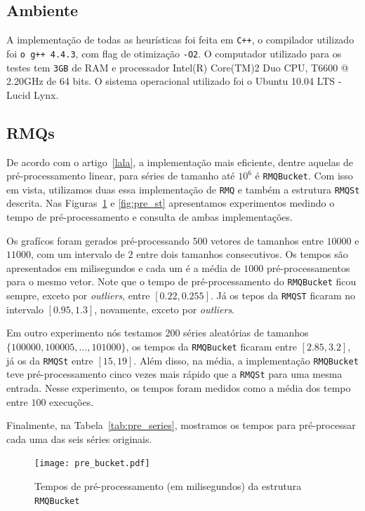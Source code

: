 \documentclass[12pt]{article}
\begin{document}
\subsection{Ambiente}

A implementação de todas as heurísticas foi feita em \verb|C++|, o compilador
utilizado foi \verb|o g++ 4.4.3|, com flag de otimização \verb|-O2|. O computador
utilizado para os testes tem \verb|3GB| de RAM e processador Intel(R) Core(TM)2 Duo CPU, T6600  @ 2.20GHz
de 64 bits. O sistema operacional utilizado foi o Ubuntu 10.04 LTS - Lucid Lynx.


\subsection{RMQs}

De acordo com o artigo~\ref{lala}, a implementação mais eficiente, dentre aquelas
de pré-processamento linear, para séries de tamanho até $10^6$ é {\tt RMQBucket}.
Com isso em vista, utilizamos duas essa implementação de {\tt RMQ} e também a estrutura
{\tt RMQSt} descrita. Nas Figuras~\ref{fig:pre_bucket} e \ref{fig:pre_st} apresentamos experimentos medindo o tempo de pré-processamento
e consulta de ambas implementações.

Os grafícos foram gerados pré-processando $500$ vetores de tamanhos entre
$10000$ e $11000$, com um intervalo de $2$ entre dois tamanhos consecutivos.
Os tempos são apresentados em milisegundos e cada um é a média
de $1000$ pré-processamentos para o mesmo vetor. Note que o tempo de pré-processamento
do {\tt RMQBucket} ficou sempre, exceto por \textit{outliers}, entre $[0.22, 0.255]$.
Já os tepos da {\tt RMQST} ficaram no intervalo $[0.95, 1.3]$, novamente, exceto por \textit{outliers}.

Em outro experimento nós testamos $200$ séries aleatórias de tamanhos $\{100000, 100005, \ldots, 101000\}$,
os tempos da {\tt RMQBucket} ficaram entre $[2.85, 3.2]$, já os da {\tt RMQSt} entre $[15,19]$. 
Além disso, na média, a implementação {\tt RMQBucket} teve pré-processamento cinco vezes mais rápido
que a {\tt RMQSt} para uma mesma entrada. Nesse experimento, os tempos foram medidos como a média
dos tempo entre $100$ execuções.

Finalmente, na Tabela~\ref{tab:pre_series}, mostramos os tempos para pré-processar cada uma das seis
séries originais.


\begin{figure}[htp]
\begin{center}
\texttt{[image: pre\_bucket.pdf]}
\caption{Tempos de pré-processamento (em milisegundos) da estrutura {\tt RMQBucket} }
\label{fig:pre_bucket}
\end{center}
\end{figure}
\end{document}
